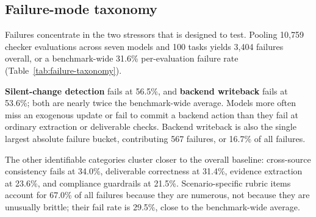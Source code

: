 \subsection{Failure-mode taxonomy}
\label{sec:exp-taxonomy}

Failures concentrate in the two stressors that \bench{} is designed to test. Pooling 10{,}759 checker evaluations across seven models and 100 tasks yields 3{,}404 failures overall, or a benchmark-wide 31.6\% per-evaluation failure rate (Table~\ref{tab:failure-taxonomy}).



\textbf{Silent-change detection} fails at 56.5\%, and \textbf{backend writeback} fails at 53.6\%; both are nearly twice the benchmark-wide average. Models more often miss an exogenous update or fail to commit a backend action than they fail at ordinary extraction or deliverable checks. Backend writeback is also the single largest absolute failure bucket, contributing 567 failures, or 16.7\% of all failures.

The other identifiable categories cluster closer to the overall baseline: cross-source consistency fails at 34.0\%, deliverable correctness at 31.4\%, evidence extraction at 23.6\%, and compliance guardrails at 21.5\%. Scenario-specific rubric items account for 67.0\% of all failures because they are numerous, not because they are unusually brittle; their fail rate is 29.5\%, close to the benchmark-wide average.

